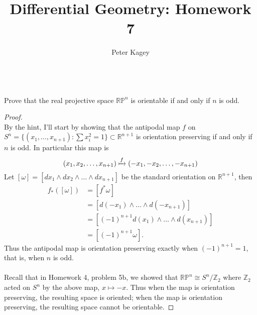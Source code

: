 \documentclass{article}
\newenvironment{problem}[2][Problem]{\begin{trivlist}
\item[\hskip \labelsep {\bfseries #1}\hskip \labelsep {\bfseries #2.}]}{\end{trivlist}}
\begin{document}
\title{Differential Geometry: Homework 7}
\author{Peter Kagey}

\maketitle

\begin{problem}{1} \text{} \\
  Prove that the real projective space $\mathbb{RP}^n$ is orientable if and only
  if $n$ is odd.
\end{problem}

\begin{proof} \text{} \\
  By the hint, I'll start by showing that the antipodal map $f$ on
  $S^n = \{(x_1, \hdots, x_{n+1}) : \sum x_i^2 = 1 \}\subset \mathbb{R}^{n+1}$ is orientation preserving if and only if $n$ is
  odd. In particular this map is \[
    (x_1, x_2, \hdots, x_{n+1}) \xmapsto{f} (-x_1, -x_2, \hdots, -x_{n+1})
  \]
  Let $[\omega] = [dx_1 \wedge dx_2 \wedge \hdots \wedge dx_{n+1}]$ be the standard
  orientation on $\mathbb{R}^{n+1}$, then \begin{align*}
    f_*([\omega])
      &= [f^*\omega] \\
      &= [d(-x_1) \wedge \hdots \wedge d(-x_{n+1})] \\
      &= [(-1)^{n+1} d(x_1) \wedge \hdots \wedge d(x_{n+1})] \\
      &= [(-1)^{n+1} \omega].
  \end{align*} Thus the antipodal map is orientation preserving exactly when
  $(-1)^{n+1} = 1$, that is, when $n$ is odd.
  \\~\\
  Recall that in Homework 4, problem 5b, we showed that $\mathbb{RP}^n \cong S^n/\mathbb{Z}_2$
  where $\mathbb{Z}_2$ acted on $S^n$ by the above map, $x \mapsto -x$. Thus
  when the map is orientation preserving, the resulting space is oriented; when
  the map is orientation preserving, the resulting space cannot be orientable.
\end{proof}
\pagebreak
\end{document}
